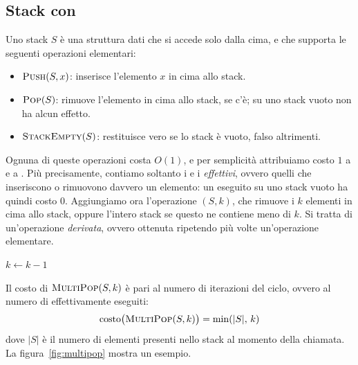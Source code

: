 \subsection{Stack con \MultiPop}\label{sec:stack}
Uno stack $S$ è una struttura dati che si accede solo dalla cima, e che supporta le seguenti operazioni elementari:
\begin{itemize}
    \item $\textsc{Push}(S,x)$: inserisce l'elemento $x$ in cima allo stack.
    \item $\textsc{Pop}(S)$: rimuove l'elemento in cima allo stack, se c'è; su uno stack vuoto non ha alcun effetto.
    \item $\textsc{StackEmpty}(S)$: restituisce vero se lo stack è vuoto, falso altrimenti.
\end{itemize}
Ognuna di queste operazioni costa $O(1)$, e per semplicità attribuiamo costo $1$ a \Push{} e a \Pop{}. Più precisamente, contiamo soltanto i \Push{} e i \Pop{} \emph{effettivi}, ovvero quelli che inseriscono o rimuovono davvero un elemento: un \Pop{} eseguito su uno stack vuoto ha quindi costo $0$. Aggiungiamo ora l'operazione \textbf{\MultiPop}$(S,k)$, che rimuove i $k$ elementi in cima allo stack, oppure l'intero stack se questo ne contiene meno di $k$. Si tratta di un'operazione \emph{derivata}, ovvero ottenuta ripetendo più volte un'operazione elementare.

\begin{algorithm}[htbp]
\caption{L'operazione $\MultiPop(S,k)$ ripete \Pop{} finché lo stack non si svuota o finché non sono stati rimossi $k$ elementi.}\label{alg:multipop}
\begin{algorithmic}[1]
    \State {}
    \State $k \gets k-1$
  \EndWhile
\EndProcedure
\end{algorithmic}
\end{algorithm}

Il costo di $\MultiPop(S,k)$ è pari al numero di iterazioni del ciclo, ovvero al numero di \Pop{} effettivamente eseguiti:
\[
\text{costo}\big(\textsc{MultiPop}(S,k)\big) = \min(|S|,\,k)
\]
dove $|S|$ è il numero di elementi presenti nello stack al momento della chiamata. La figura~\ref{fig:multipop} mostra un esempio.

